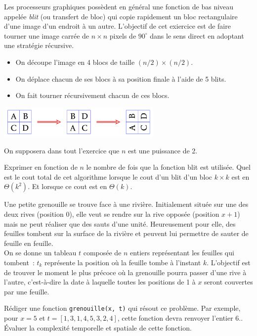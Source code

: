 \documentclass{magnolia}
\begin{document}
Les processeurs graphiques possèdent en général une fonction de bas niveau appelée
\emph{blit} (ou transfert de bloc) qui copie rapidement un bloc rectangulaire d'une image
d'un endroit à un autre. L'objectif de cet exiercice est de faire tourner une image carrée
de $n\times n$ pixels de $90^{\circ}$ dans le sens direct en adoptant une stratégie récursive.
\begin{itemize}
\item On découpe l'image en 4 blocs de taille $(n/2)\times(n/2)$.
\item On déplace chacun de ses blocs à sa position finale à l'aide de 5 blits.
\item On fait tourner récursivement chacun de ces blocs.
\end{itemize}
\begin{center}
\includegraphics[width=0.6\textwidth]{../../Commun/Images/python-exos-rec-2.pdf}
\end{center}
On supposera dans tout l'exercice que $n$ est une puissance de 2.
\begin{questions}
\question Exprimer en fonction de $n$ le nombre de fois que la fonction blit est utilisée.
\question Quel est le cout total de cet algorithme lorsque le cout d'un blit d'un bloc
  $k\times k$ est en $\Theta(k^2)$.
\question Et lorsque ce cout est en $\Theta(k)$.
\end{questions}


Une petite grenouille se trouve face à une rivière. Initialement située sur une des deux rives
(position 0), elle veut se rendre sur la rive opposée (position $x+1$) mais ne peut réaliser
que des sauts d'une unité. Heureusement pour elle, des feuilles tombent sur la surface de la
rivière et peuvent lui permettre de sauter de feuille en feuille.\\
On se donne un tableau $t$ composée de $n$ entiers représentant les feuilles qui tombent~:
$t_k$ représente la position où la feuille tombe à l'instant $k$. L'objectif est de trouver
le moment le plus précoce où la grenouille pourra passer d'une rive à l'autre,
c'est-à-dire la date à laquelle toutes les positions de 1 à $x$ seront couvertes par une
feuille.
\begin{questions}
\question Rédiger une fonction \verb!grenouille(x, t)! qui résout ce problème. Par exemple,
  pour $x=5$ et $t=[1, 3, 1, 4, 5, 3, 2, 4]$, cette fonction devra renvoyer l'entier 6..
\question Évaluer la complexité temporelle et spatiale de cette fonction.
\end{questions}
\end{document}
